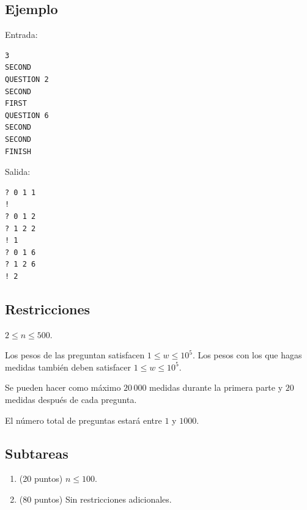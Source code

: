 \documentclass[10.5pt]{article}
\begin{document}
\subsection*{Ejemplo}

Entrada:
\begin{verbatim}
3
SECOND
QUESTION 2
SECOND
FIRST
QUESTION 6
SECOND
SECOND
FINISH
\end{verbatim}



Salida:
\begin{verbatim}
? 0 1 1
!
? 0 1 2
? 1 2 2
! 1
? 0 1 6
? 1 2 6
! 2
\end{verbatim}

\subsection*{Restricciones}

$2 \leq n \leq 500$.

Los pesos de las preguntan satisfacen $1 \leq w \leq 10^5$. Los pesos con los que hagas medidas tambi\'en deben satisfacer $1 \leq w \leq 10^5$.

Se pueden hacer como m\'aximo $20\,000$ medidas durante la primera parte y $20$ medidas despu\'es de cada pregunta.

El n\'umero total de preguntas estar\'a entre $1$ y $1000$. 

\subsection*{Subtareas}

\begin{enumerate}
    \item (20 puntos) $n \leq 100$.
    \item (80 puntos) Sin restricciones adicionales.
    
\end{enumerate}
\end{document}
